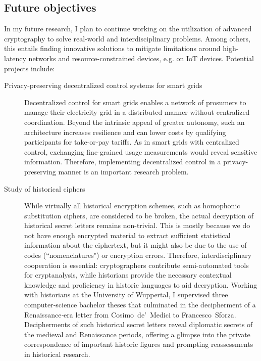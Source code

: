 \documentclass{article}
\begin{document}
 \subsection*{Future objectives}
In my future research, I plan to continue working on the utilization of advanced cryptography to solve real-world and interdisciplinary problems. Among others, this entails finding innovative solutions to mitigate limitations around high-latency networks and resource-constrained devices, e.g. on IoT devices. Potential projects include:
\begin{description}

    \item[Privacy-preserving decentralized control systems for smart grids] Decentralized control for smart grids \cite{KILTHAU2025124606} enables a network of prosumers to manage their electricity grid in a distributed manner without centralized coordination. Beyond the intrinsic appeal of greater autonomy, such an architecture increases resilience and can lower costs by qualifying participants for take‑or‑pay tariffs. As in smart grids with centralized control, exchanging fine-grained usage measurements would reveal sensitive information. Therefore, implementing decentralized control in a privacy-preserving manner is an important research problem.
    \item[Study of historical ciphers] While virtually all historical encryption schemes, such as homophonic substitution ciphers, are considered to be broken, the actual decryption of historical secret letters remains non-trivial. This is mostly because we do not have enough encrypted material to extract sufficient statistical information about the ciphertext, but it might also be due to the use of codes (``nomenclatures") or encryption errors. Therefore, interdisciplinary cooperation is essential: cryptographers contribute semi-automated tools for cryptanalysis, while historians provide the necessary contextual knowledge and proficiency  in historic languages to aid decryption. Working with historians at the University of Wuppertal, I supervised three computer‑science bachelor theses that culminated in the decipherment of a Renaissance‑era letter from Cosimo~de'~Medici to Francesco~Sforza.
 Decipherments of such historical secret letters
 reveal diplomatic secrets of the medieval and Renaissance periods, offering a glimpse into the private correspondence of important historic figures and prompting reassessments in historical research.


\end{description}
\end{document}
